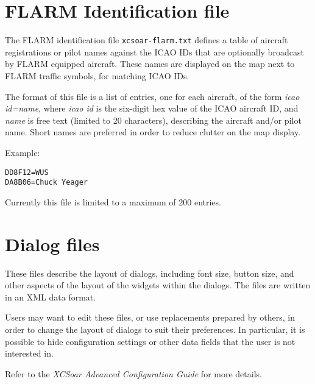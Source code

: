 \section{FLARM Identification file}\label{sec:flarm-ident-file}

The FLARM identification file \verb|xcsoar-flarm.txt| defines a table
of aircraft registrations or pilot names against the ICAO IDs that are
optionally broadcast by FLARM equipped aircraft.  These names are
displayed on the map next to FLARM traffic symbols, for matching ICAO
IDs.

The format of this file is a list of entries, one for each aircraft,
of the form {\em icao id=name}, where {\em icao id} is the six-digit
hex value of the ICAO aircraft ID, and {\em name} is free text
(limited to 20 characters), describing the aircraft and/or pilot name.
Short names are preferred in order to reduce clutter on the map
display.

Example:
\begin{verbatim}
DD8F12=WUS
DA8B06=Chuck Yeager
\end{verbatim}

Currently this file is limited to a maximum of 200 entries.

\section{Dialog files}\label{sec:dialog-files}

These files describe the layout of dialogs, including font size,
button size, and other aspects of the layout of the widgets within
the dialogs.  The files are written in an XML data format.

Users may want to edit these files, or use replacements prepared by
others, in order to change the layout of dialogs to suit their
preferences.  In particular, it is possible to hide configuration
settings or other data fields that the user is not interested in.

Refer to the {\em XCSoar Advanced Configuration Guide} for more details.
